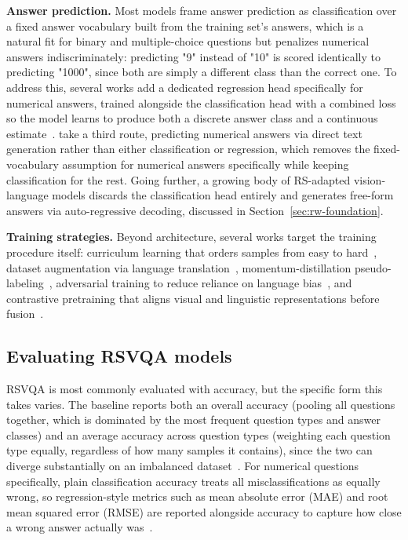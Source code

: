 \textbf{Answer prediction.} Most models frame answer prediction as classification over a fixed answer vocabulary built from the training set's answers, which is a natural fit for binary and multiple-choice questions but penalizes numerical answers indiscriminately: predicting "9" instead of "10" is scored identically to predicting "1000", since both are simply a different class than the correct one. To address this, several works add a dedicated regression head specifically for numerical answers, trained alongside the classification head with a combined loss so the model learns to produce both a discrete answer class and a continuous estimate~\cite{lobry2020rsvqa,blaga2024counting}. \textcite{chappuis2023multitask} take a third route, predicting numerical answers via direct text generation rather than either classification or regression, which removes the fixed-vocabulary assumption for numerical answers specifically while keeping classification for the rest. Going further, a growing body of RS-adapted vision-language models discards the classification head entirely and generates free-form answers via auto-regressive decoding, discussed in Section~\ref{sec:rw-foundation}.

\textbf{Training strategies.} Beyond architecture, several works target the training procedure itself: curriculum learning that orders samples from easy to hard~\cite{yuan2022acurriculum}, dataset augmentation via language translation~\cite{yuan2023amultilingual}, momentum-distillation pseudo-labeling~\cite{li2024rsmodm}, adversarial training to reduce reliance on language bias~\cite{yuan2023badversarial}, and contrastive pretraining that aligns visual and linguistic representations before fusion~\cite{tian2024amvqa}.

\subsection{Evaluating RSVQA models}
\label{sec:rw-vqa-metrics}

RSVQA is most commonly evaluated with accuracy, but the specific form this takes varies. The baseline reports both an overall accuracy (pooling all questions together, which is dominated by the most frequent question types and answer classes) and an average accuracy across question types (weighting each question type equally, regardless of how many samples it contains), since the two can diverge substantially on an imbalanced dataset~\cite{lobry2020rsvqa}. For numerical questions specifically, plain classification accuracy treats all misclassifications as equally wrong, so regression-style metrics such as mean absolute error (MAE) and root mean squared error (RMSE) are reported alongside accuracy to capture how close a wrong answer actually was~\cite{lobry2020rsvqa}.

